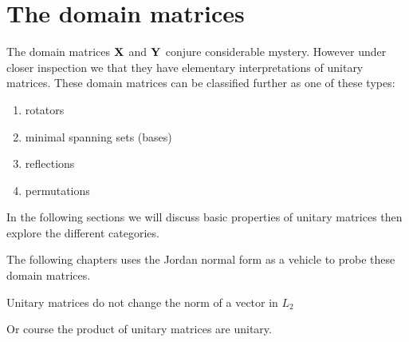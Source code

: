 \chapter{The domain matrices}
The domain matrices $\textbf{X}^{\mathrm{}}$ and $\textbf{Y}^{\mathrm{}}$ conjure considerable mystery. However under closer inspection we that they have elementary interpretations of unitary matrices. These domain matrices can be classified further as one of these types:
\begin{enumerate}
\item rotators
\item minimal spanning sets (bases)
\item reflections
\item permutations
\end{enumerate}

In the following sections we will discuss basic properties of unitary matrices then explore the different categories. 

The following chapters uses the Jordan normal form as a vehicle to probe these domain matrices.

Unitary matrices do not change the norm of a vector in $L_{2}$

Or course the product of unitary matrices are unitary.



%
%
%
%
%


\endinput